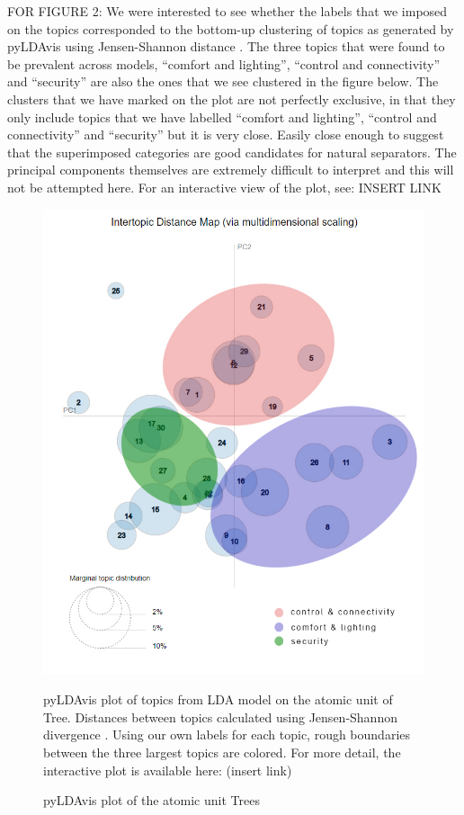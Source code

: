 \documentclass{article}
\begin{document}
    FOR FIGURE 2: 
    We were interested to see whether the labels that we imposed on the topics corresponded to the bottom-up clustering of topics as generated by pyLDAvis using Jensen-Shannon distance \cite{sievert2014ldavis}. The three topics that were found to be prevalent across models, “comfort and lighting”, “control and connectivity” and “security” are also the ones that we see clustered in the figure below. The clusters that we have marked on the plot are not perfectly exclusive, in that they only include topics that we have labelled “comfort and lighting”, “control and connectivity” and “security” but it is very close. Easily close enough to suggest that the superimposed categories are good candidates for natural separators. The principal components themselves are extremely difficult to interpret and this will not be attempted here. For an interactive view of the plot, see: INSERT LINK
    
    \begin{figure}[H]
        \begin{centering}
        \includegraphics[scale=0.4]{../Figure/pyLDAvis_edit.jpg}
        \caption{pyLDAvis plot of the atomic unit Trees}
        \end{centering}
        \begin{footnotesize} 
            pyLDAvis plot of topics from LDA model on the atomic unit of Tree. Distances between topics calculated using Jensen-Shannon divergence \cite{sievert2014ldavis}. Using our own labels for each topic, rough boundaries between the three largest topics are colored. For more detail, the interactive plot is available here: (insert link)
        \end{footnotesize}
    \end{figure}
    
\end{document}

